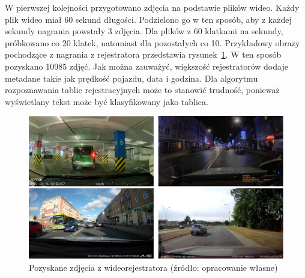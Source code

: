 W pierwszej kolejności przygotowano zdjęcia na podstawie plików wideo.
Każdy plik wideo miał 60 sekund długości.
Podzielono go w ten sposób, aby z każdej sekundy nagrania powstały 3 zdjęcia.
Dla plików z 60 klatkami na sekundy, próbkowano co 20 klatek, natomiast dla pozostałych co 10.
Przykładowy obrazy pochodzące z nagrania z rejestratora przedstawia rysunek~\ref{fig:captured_frame}.
W ten sposób pozyskano 10985 zdjęć.
Jak można zauważyć, większość rejestratorów dodaje metadane takie jak prędkość pojazdu, data i godzina.
Dla algorytmu rozpoznawania tablic rejestracyjnych może to stanowić trudność, ponieważ wyświetlany tekst może być klasyfikowany jako tablica.
\begin{figure}[!ht]
    \centering
    \includegraphics[scale=0.4]{Pictures/captured_frames}
    \caption{Pozyskane zdjęcia z wideorejestratora (źródło: opracowanie własne)}
    \label{fig:captured_frame}
\end{figure}
\FloatBarrier

